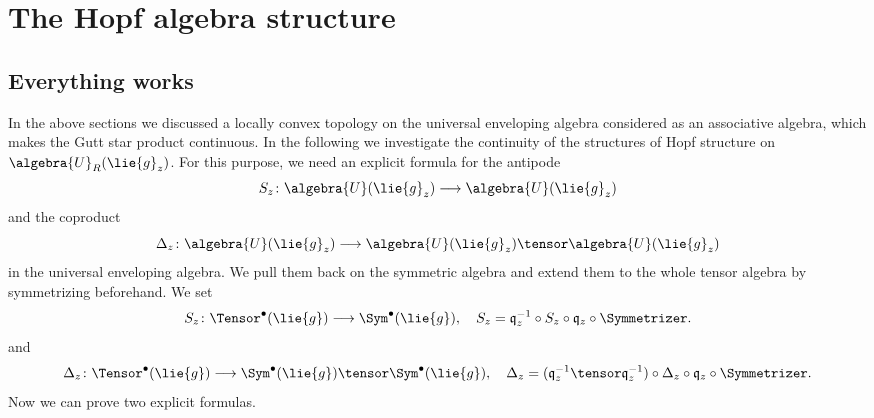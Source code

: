 
%
%

\chapter{The Hopf algebra structure}

\section{Everything works}

In the above sections we discussed a locally convex topology on the universal
enveloping algebra considered as an associative algebra, which makes the Gutt 
star product continuous. In the following we investigate the continuity of the structures
of Hopf structure on $\algebra{U}_R(\lie{g}_z)$. 
For this purpose, we need an explicit formula for
the antipode
\begin{equation}
    \label{eq:Antipode}
    S_z \colon
    \algebra{U}(\lie{g}_z)
    \longrightarrow
    \algebra{U}(\lie{g}_z)
\end{equation}
and the coproduct
\begin{equation}
    \label{eq:CoProduct}
    \coproduct_z \colon
    \algebra{U}(\lie{g}_z)
    \longrightarrow
    \algebra{U}(\lie{g}_z)
    \tensor
    \algebra{U}(\lie{g}_z)
\end{equation}
in the universal enveloping algebra. We pull them back on the symmetric 
algebra and extend them to the whole tensor algebra by symmetrizing beforehand.
We set
\begin{equation}
    \label{eq:AntipodeOnTensor}
    S_z \colon
    \Tensor^\bullet(\lie{g})
    \longrightarrow
    \Sym^\bullet(\lie{g})
    , \quad
    S_z
    =
    \mathfrak{q}_z^{-1}
    \circ
    S_z
    \circ
    \mathfrak{q}_z
    \circ
    \Symmetrizer.
\end{equation}
and
\begin{equation}
    \label{eq:CoProductOnTensor}
    \ocoproduct_z \colon
    \Tensor^\bullet(\lie{g})
    \longrightarrow
    \Sym^\bullet(\lie{g})
    \tensor
    \Sym^\bullet(\lie{g})
    , \quad
    \ocoproduct_z
    =
    (\mathfrak{q}_z^{-1} \tensor \mathfrak{q}_z^{-1})
    \circ
    \coproduct_z
    \circ
    \mathfrak{q}_z
    \circ
    \Symmetrizer.
\end{equation}
Now we can prove two explicit formulas.
